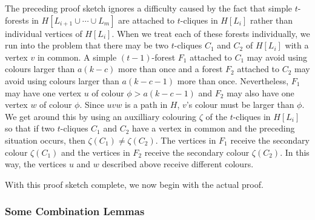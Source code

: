 \documentclass[kpfonts]{patmorin}
\theoremstyle{named}
\begin{document}
The preceding proof sketch ignores a difficulty caused by the fact that simple $t$-forests in $H[L_{i+1}\cup\cdots\cup L_m]$ are attached to $t$-cliques in $H[L_i]$ rather than individual vertices of $H[L_i]$.  When we treat each of these forests individually, we run into the problem that there may be two $t$-cliques $C_1$ and $C_2$ of $H[L_i]$ with a vertex $v$ in common.  A simple $(t-1)$-forest $F_1$ attached to $C_1$ may avoid using colours larger than $a(k-c)$ more than once and a forest $F_2$ attached to $C_2$ may avoid using colours larger than $a(k-c-1)$ more than once.  Nevertheless, $F_1$ may have one vertex $u$ of colour $\phi >a(k-c-1)$ and $F_2$ may also have one vertex $w$ of colour $\phi$.  Since $uvw$ is a path in $H$, $v$'s colour must be larger than $\phi$.  We get around this by using an auxilliary colouring $\zeta$ of the $t$-cliques in $H[L_i]$ so that if two $t$-cliques $C_1$ and $C_2$ have a vertex in common and the preceding situation occurs, then $\zeta(C_1)\neq \zeta(C_2)$.  The vertices in $F_1$ receive the secondary colour $\zeta(C_1)$ and the vertices in $F_2$ receive the secondary colour $\zeta(C_2)$.  In this way, the vertices $u$ and $w$ described above receive different colours.

With this proof sketch complete, we now begin with the actual proof.

\subsubsection{Some Combination Lemmas}

\end{document}
